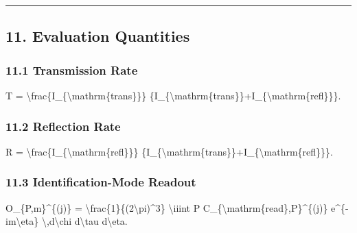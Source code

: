 \documentclass[
  a4paper,
]{article}
\newenvironment{Shaded}{}{}
\newcommand{\NormalTok}[1]{#1}
\begin{document}
\begin{center}\rule{0.5\linewidth}{0.5pt}\end{center}

\subsection{11. Evaluation Quantities}\label{evaluation-quantities}

\subsubsection{11.1 Transmission Rate}\label{transmission-rate}

\begin{Shaded}
\begin{Highlighting}[]
\NormalTok{T}
\NormalTok{=}
\NormalTok{\textbackslash{}frac\{I\_\{\textbackslash{}mathrm\{trans\}\}\}}
\NormalTok{\{I\_\{\textbackslash{}mathrm\{trans\}\}+I\_\{\textbackslash{}mathrm\{refl\}\}\}.}
\end{Highlighting}
\end{Shaded}

\subsubsection{11.2 Reflection Rate}\label{reflection-rate}

\begin{Shaded}
\begin{Highlighting}[]
\NormalTok{R}
\NormalTok{=}
\NormalTok{\textbackslash{}frac\{I\_\{\textbackslash{}mathrm\{refl\}\}\}}
\NormalTok{\{I\_\{\textbackslash{}mathrm\{trans\}\}+I\_\{\textbackslash{}mathrm\{refl\}\}\}.}
\end{Highlighting}
\end{Shaded}

\subsubsection{11.3 Identification-Mode
Readout}\label{identification-mode-readout}

\begin{Shaded}
\begin{Highlighting}[]
\NormalTok{O\_\{P,m\}\^{}\{(j)\}}
\NormalTok{=}
\NormalTok{\textbackslash{}frac\{1\}\{(2\textbackslash{}pi)\^{}3\}}
\NormalTok{\textbackslash{}iiint}
\NormalTok{P}
\NormalTok{C\_\{\textbackslash{}mathrm\{read\},P\}\^{}\{(j)\}}
\NormalTok{e\^{}\{{-}im\textbackslash{}eta\}}
\NormalTok{\textbackslash{},d\textbackslash{}chi d\textbackslash{}tau d\textbackslash{}eta.}
\end{Highlighting}
\end{Shaded}
\end{document}
